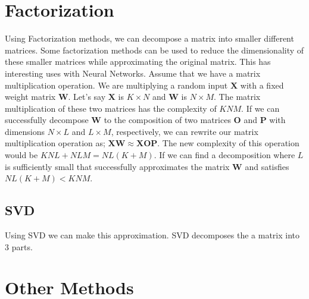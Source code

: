\section{Factorization}
Using Factorization methods, we can decompose a matrix into smaller different matrices. Some factorization methods can be used to reduce the dimensionality of these smaller matrices while approximating the original matrix. This has interesting uses with Neural Networks. Assume that we have a matrix multiplication operation. We are multiplying a random input $\mathbf{X}$ with a fixed weight matrix $\mathbf{W}$. Let's say $\mathbf{X}$ is $K \times N$ and $\mathbf{W}$ is $N \times M$. The matrix multiplication of these two matrices has the complexity of $KNM$. If we can successfully decompose $\mathbf{W}$ to the composition of two matrices $\mathbf{O}$ and $\mathbf{P}$ with dimensions $N \times L$ and $L \times M$, respectively, we can rewrite our matrix multiplication operation as; $\mathbf{X}\mathbf{W} \approx \mathbf{X}\mathbf{O}\mathbf{P}$. The new complexity of this operation would be $KNL + NLM = NL(K+M)$. If we can find a decomposition where $L$ is sufficiently small that successfully approximates the matrix $\mathbf{W}$ and satisfies $NL(K+M) < KNM$.
\subsection{SVD}
Using SVD we can make this approximation. SVD decomposes the a matrix into 3 parts. 
\section{Other Methods}
